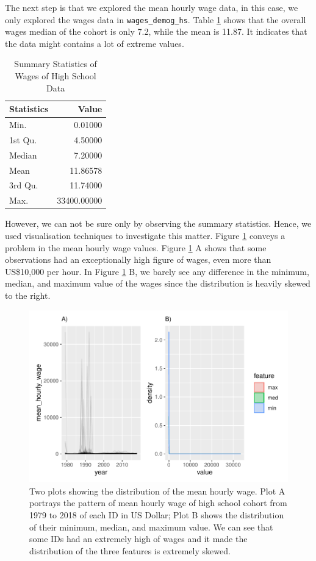 \documentclass{article}
\begin{document}
The next step is that we explored the mean hourly wage data, in this case, we only explored the wages data in \texttt{wages\_demog\_hs}. Table \ref{tab:summarytable} shows that the overall wages median of the cohort is only 7.2, while the mean is 11.87. It indicates that the data might contains a lot of extreme values.

\begin{table}

\caption{\label{tab:summarytable}Summary Statistics of Wages of High School Data}
\centering
\begin{tabular}[t]{l|r}
\hline
Statistics & Value\\
\hline
\rowcolor{gray!6}  Min. & 0.01000\\
\hline
1st Qu. & 4.50000\\
\hline
\rowcolor{gray!6}  Median & 7.20000\\
\hline
Mean & 11.86578\\
\hline
\rowcolor{gray!6}  3rd Qu. & 11.74000\\
\hline
Max. & 33400.00000\\
\hline
\end{tabular}
\end{table}

However, we can not be sure only by observing the summary statistics. Hence, we used visualisation techniques to investigate this matter. Figure \ref{fig:feature-plot} conveys a problem in the mean hourly wage values. Figure \ref{fig:feature-plot} A shows that some observations had an exceptionally high figure of wages, even more than US\$10,000 per hour. In Figure \ref{fig:feature-plot} B, we barely see any difference in the minimum, median, and maximum value of the wages since the distribution is heavily skewed to the right.

\begin{figure}
\centering
\includegraphics{figures/feature-plot-1.pdf}
\caption{\label{fig:feature-plot}Two plots showing the distribution of the mean hourly wage. Plot A portrays the pattern of mean hourly wage of high school cohort from 1979 to 2018 of each ID in US Dollar; Plot B shows the distribution of their minimum, median, and maximum value. We can see that some IDs had an extremely high of wages and it made the distribution of the three features is extremely skewed.}
\end{figure}
\end{document}
